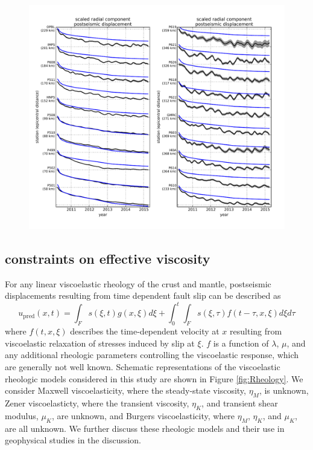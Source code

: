 \documentclass[1p]{elsarticle}
\begin{document}
\begin{figure}
\includegraphics[scale=0.7]{Figures/RecordSectionElastic}
\caption{}
\label{fig:RecordSectionElastic}
\end{figure}

\subsection{constraints on effective viscosity}\label{sec:InitialInversion}


For any linear viscoelastic rheology of the crust and mantle, postseismic displacements resulting from time dependent fault slip can be described as  
\begin{equation}\label{GeneralForward}
  u_\mathrm{pred}(x,t) = \int_F s(\xi,t)g(x,\xi)d\xi + 
           \int_0^t\int_F s(\xi,\tau) f(t-\tau,x,\xi) d\xi d\tau
\end{equation}
where $f(t,x,\xi)$ describes the time-dependent velocity at $x$ resulting from viscoelastic relaxation of stresses induced by slip at $\xi$. $f$ is a function of $\lambda$, $\mu$, and any additional rheologic parameters controlling the viscoelastic response, which are generally not well known. Schematic representations of the viscoelastic rheologic models considered in this study are shown in Figure \ref{fig:Rheology}.  We consider Maxwell viscoelasticity, where the steady-state viscosity, $\eta_M$, is unknown, Zener viscoelasticty, where the transient viscosity, $\eta_K$, and transient shear modulus, $\mu_K$, are unknown, and Burgers viscoelasticity, where $\eta_M$, $\eta_K$, and $\mu_K$, are all unknown. We further discuss these rheologic models and their use in geophysical studies in the discussion. 
\end{document}
